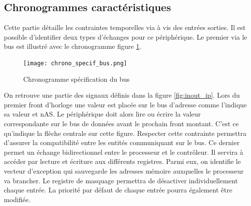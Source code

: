 \subsection{Chronogrammes caractéristiques}
Cette partie détaille les contraintes temporelles via à vis des entrées sorties. 
Il est possible d'identifier deux types d'échanges pour ce périphérique.
Le premier via le bus est illustré avec le chronogramme figure \ref{fig:spe_bus}.
\begin{figure}[H]
	\centering
	\texttt{[image: chrono\_specif\_bus.png]}
	\caption{Chronogramme spécification du bus}
	\label{fig:spe_bus}
\end{figure}
On retrouve une partie des signaux définis dans la figure \ref{fig:inout_ip}. 
Lors du premier front d'horloge une valeur est placée sur le bus d'adresse comme l'indique sa valeur et nAS. 
Le périphérique doit alors lire ou écrire la valeur correspondante sur le bus de données avant le prochain front montant. 
C'est ce qu'indique la flèche centrale sur cette figure. 
Respecter cette contrainte permettra d'assurer la compatibilité entre les entités communiquant sur le bus.
Ce dernier permet un échange bidirectionnel entre le processeur et le contrôleur.
Il servira à accéder par lecture et écriture aux différents registres.
Parmi eux, on identifie le vecteur d'exception qui sauvegarde les adresses mémoire auxquelles le processeur va brancher.
Le registre de masquage permettra de désactiver individuellement chaque entrée.
La priorité par défaut de chaque entrée pourra également être modifiée.

